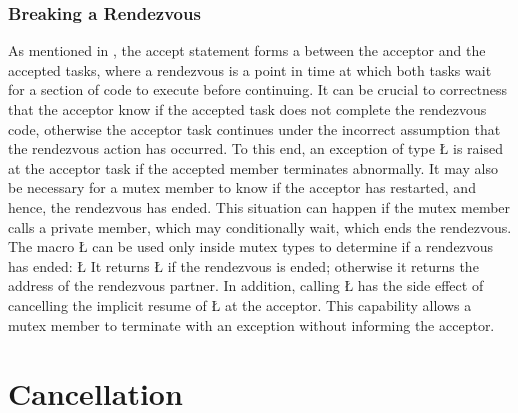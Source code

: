 \documentclass[openright,twoside]{report}
\begin{document}
\subsection{Breaking a Rendezvous}
\label{s:BreakingRendezvous2}

As mentioned in , the accept statement forms a  between the acceptor and the accepted tasks, where a rendezvous is a point in time at which both tasks wait for a section of code to execute before continuing.
It can be crucial to correctness that the acceptor know if the accepted task does not complete the rendezvous code, otherwise the acceptor task continues under the incorrect assumption that the rendezvous action has occurred.
To this end, an exception of type \LGinlinetrue\LGbegin\lgrinde\L{}\endlgrinde\LGend{} is raised at the acceptor task if the accepted member terminates abnormally.
It may also be necessary for a mutex member to know if the acceptor has restarted, and hence, the rendezvous has ended.
This situation can happen if the mutex member calls a private member, which may conditionally wait, which ends the rendezvous.
The macro \LGinlinetrue\LGbegin\lgrinde\L{}\endlgrinde\LGend{} can be used only inside mutex types to determine if a rendezvous has ended:
\LGinlinefalse\LGbegin\lgrinde
\L{}
\endlgrinde\LGend
It returns \LGinlinetrue\LGbegin\lgrinde\L{}\endlgrinde\LGend{} if the rendezvous is ended;
otherwise it returns the address of the rendezvous partner.
In addition, calling \LGinlinetrue\LGbegin\lgrinde\L{}\endlgrinde\LGend{} has the side effect of cancelling the implicit resume of \LGinlinetrue\LGbegin\lgrinde\L{}\endlgrinde\LGend{} at the acceptor.
This capability allows a mutex member to terminate with an exception without informing the acceptor.


\chapter{Cancellation}
\label{s:Cancellation}
\end{document}
